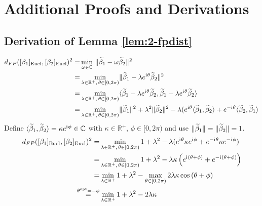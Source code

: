 \label{app:a}

\section{Additional Proofs and Derivations}
\label{app:a-deriv}

\subsection{Derivation of Lemma \ref{lem:2-fpdist}}
\label{app:a-deriv-fpdist}
\begin{align*}
  d_{FP}([\beta_1]_{\mathrm{Eucl}},[\beta_2]_{\mathrm{Eucl}})^2 
    = & \min_{\omega \in \mathbb{C}} \,\, \lVert\widetilde \beta_1 - \omega \widetilde \beta_2\rVert^2 \\
    = & \min_{\lambda \in \mathbb{R}^+,\, \theta \in [0,2\pi)} \lVert\widetilde \beta_1 - \lambda e^{\mathrm{i}\mkern1mu\theta} \widetilde \beta_2\rVert^2 \\
    = & \min_{\lambda \in \mathbb{R}^+,\, \theta \in [0,2\pi)} \langle \widetilde \beta_1 - \lambda e^{\mathrm{i}\mkern1mu\theta} \widetilde \beta_2, \widetilde \beta_1 - \lambda e^{\mathrm{i}\mkern1mu\theta} \widetilde \beta_2 \rangle \\
    = & \min_{\lambda \in \mathbb{R}^+,\, \theta \in [0,2\pi)} \lVert\widetilde \beta_1\rVert^2 + \lambda^2 \lVert\widetilde \beta_2\rVert^2 - \lambda ( e^{\mathrm{i}\mkern1mu\theta} \langle \widetilde \beta_1, \widetilde \beta_2 \rangle + e^{-\mathrm{i}\mkern1mu\theta} \langle \widetilde \beta_2, \widetilde \beta_1 \rangle 
\end{align*}
Define $\langle \widetilde \beta_1, \widetilde \beta_2 \rangle = \kappa e^{\mathrm{i}\mkern1mu\phi} \in \mathbb{C}$ with $\kappa \in \mathbb{R}^+$, $\phi \in [0,2\pi)$ and use $\lVert\widetilde \beta_1\rVert = \lVert\widetilde \beta_2\rVert = 1$.
\begin{align*}
  d_{FP}([\beta_1]_{\mathrm{Eucl}},[\beta_2]_{\mathrm{Eucl}})^2 
   = &  \min_{\lambda \in \mathbb{R}^+,\, \theta \in [0,2\pi)} 1 + \lambda^2  - \lambda ( e^{\mathrm{i}\mkern1mu\theta} \kappa e^{\mathrm{i}\mkern1mu\phi} + e^{-\mathrm{i}\mkern1mu\theta} \kappa e^{-\mathrm{i}\mkern1mu\phi} ) \\
   = &  \min_{\lambda \in \mathbb{R}^+,\, \theta \in [0,2\pi)} 1 + \lambda^2  - \lambda \kappa \left( e^{\mathrm{i}\mkern1mu(\theta + \phi)} + e^{-\mathrm{i}\mkern1mu (\theta + \phi)} \right) \\
   = &  \min_{\lambda \in \mathbb{R}^+} 1 + \lambda^2  - \max_{\theta \in [0,2\pi)} 2 \lambda \kappa \cos{(\theta + \phi)} \\
   \overset{\theta^\mathrm{opt} = -\phi}{=} & \min_{\lambda \in \mathbb{R}^+} 1 + \lambda^2  - 2 \lambda \kappa
\end{align*}
